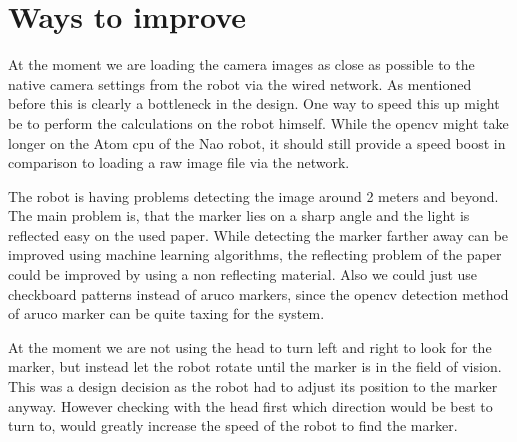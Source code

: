 \documentclass{article}
\begin{document}
\section{Ways to improve}
At the moment we are loading the camera images as close as possible to the native camera settings from the robot via the wired network. As mentioned before this is clearly a bottleneck in the design. One way to speed this up might be to perform the calculations on the robot himself. While the opencv might take longer on the Atom cpu of the Nao robot, it should still provide a speed boost in comparison to loading a raw image file via the network.

The robot is having problems detecting the image around 2 meters and beyond. The main problem is, that the marker lies on a sharp angle and the light is reflected easy on the used paper. While detecting the marker farther away can be improved using machine learning algorithms, the reflecting problem of the paper could be improved by using a non reflecting material. Also we could just use checkboard patterns instead of aruco markers, since the opencv detection method of aruco marker can be quite taxing for the system.

At the moment we are not using the head to turn left and right to look for the marker, but instead let the robot rotate until the marker is in the field of vision. This was a design decision as the robot had to adjust its position to the marker anyway. However checking with the head first which direction would be best to turn to, would greatly increase the speed of the robot to find the marker.
\end{document}
